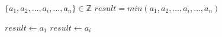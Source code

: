   \REQUIRE $\{a_1, a_2,\ldots, a_i, \ldots, a_n\} \in \mathbb{Z}$
  \ENSURE $result = min({a_1, a_2,\ldots, a_i, \ldots, a_n})$

  \STATE $result \leftarrow a_1$
      \STATE $result \leftarrow a_i$
      \ENDIF
  \ENDFOR
